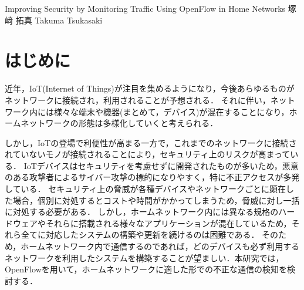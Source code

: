\documentclass[a4paper,10pt,twocolumn,uplatex]{jsarticle}
\date{10}
\begin{document}
{Improving Security by Monitoring Traffic Using OpenFlow in Home Networks}
{塚﨑 拓真}
{Takuma Tsukasaki}

\section{はじめに}
近年，IoT(Internet of Things)が注目を集めるようになり，今後あらゆるものがネットワークに接続され，利用されることが予想される．
それに伴い，ネットワーク内には様々な端末や機器(まとめて，デバイス)が混在することになり，ホームネットワークの形態は多様化していくと考えられる．\par
しかし，IoTの登場で利便性が高まる一方で，これまでのネットワークに接続されていないモノが接続されることにより，セキュリティ上のリスクが高まっている\cite{guideline}．
IoTデバイスはセキュリティを考慮せずに開発されたものが多いため，悪意のある攻撃者によるサイバー攻撃の標的になりやすく，特に不正アクセスが多発している．
セキュリティ上の脅威が各種デバイスやネットワークごとに顕在した場合，個別に対処するとコストや時間がかかってしまうため，脅威に対し一括に対処する必要がある．
しかし，ホームネットワーク内には異なる規格のハードウェアやそれらに搭載される様々なアプリケーションが混在しているため，それら全てに対応したシステムの構築や更新を続けるのは困難である．
そのため，ホームネットワーク内で通信するのであれば，どのデバイスも必ず利用するネットワークを利用したシステムを構築することが望ましい．本研究では，OpenFlowを用いて，ホームネットワークに適した形での不正な通信の検知を検討する．

\end{document}
